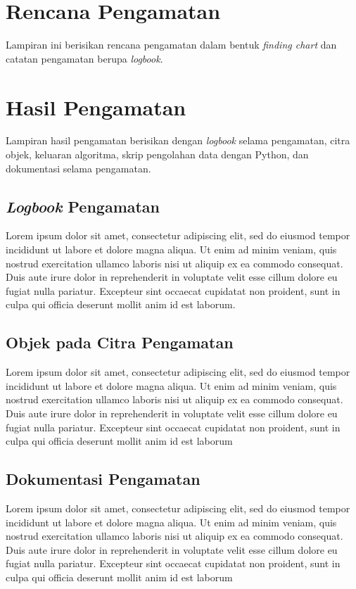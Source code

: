 \chapter{Rencana Pengamatan}
Lampiran ini berisikan rencana pengamatan dalam bentuk \textit{finding chart} dan catatan pengamatan berupa \textit{logbook}.


\chapter{Hasil Pengamatan} \label{lampiranD}
Lampiran hasil pengamatan berisikan dengan \textit{logbook} selama pengamatan, citra objek, keluaran algoritma, skrip pengolahan data dengan Python, dan dokumentasi selama pengamatan.
    \section{\textit{Logbook} Pengamatan}
     Lorem ipsum dolor sit amet, consectetur adipiscing elit, sed do eiusmod tempor incididunt ut labore et dolore magna aliqua. Ut enim ad minim veniam, quis nostrud exercitation ullamco laboris nisi ut aliquip ex ea commodo consequat. Duis aute irure dolor in reprehenderit in voluptate velit esse cillum dolore eu fugiat nulla pariatur. Excepteur sint occaecat cupidatat non proident, sunt in culpa qui officia deserunt mollit anim id est laborum.
    \section{Objek pada Citra Pengamatan}
    Lorem ipsum dolor sit amet, consectetur adipiscing elit, sed do eiusmod tempor incididunt ut labore et dolore magna aliqua. Ut enim ad minim veniam, quis nostrud exercitation ullamco laboris nisi ut aliquip ex ea commodo consequat. Duis aute irure dolor in reprehenderit in voluptate velit esse cillum dolore eu fugiat nulla pariatur. Excepteur sint occaecat cupidatat non proident, sunt in culpa qui officia deserunt mollit anim id est laborum

    \section{Dokumentasi Pengamatan}
  Lorem ipsum dolor sit amet, consectetur adipiscing elit, sed do eiusmod tempor incididunt ut labore et dolore magna aliqua. Ut enim ad minim veniam, quis nostrud exercitation ullamco laboris nisi ut aliquip ex ea commodo consequat. Duis aute irure dolor in reprehenderit in voluptate velit esse cillum dolore eu fugiat nulla pariatur. Excepteur sint occaecat cupidatat non proident, sunt in culpa qui officia deserunt mollit anim id est laborum

